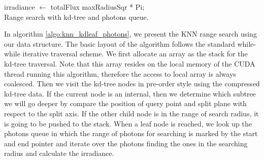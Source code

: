 \begin{algorithm}
	\Return irradiance \(\leftarrow\) totalFlux \/ maxRadiusSqr * Pi; \\
	
	\caption{Range search with kd-tree and photons queue.} 	
	\label{algo:knn_kdleaf_photons}
\end{algorithm}

In algorithm \ref{algo:knn_kdleaf_photons}, we present the KNN range search using our data structure. The basic layout of the algorithm follows the standard while-while iterative traversal scheme.  We first allocate an array as the stack for the kd-tree traversal. Note that this array resides on the local memory of the CUDA thread running this algorithm, therefore the access to local array is always coalesced. Then we visit the kd-tree nodes in pre-order style using the compressed kd-tree data. If the current node is an internal, then we determine which subtree we will go deeper by compare the position of query point and split plane with respect to the split axis. If the other child node is in the range of search radius, it is going to be pushed to the stack. When a leaf node is reached, we look up the photons queue in which the range of photons for searching is marked by the start and end pointer and iterate over the photons finding the ones in the searching radius and calculate the irradiance.

